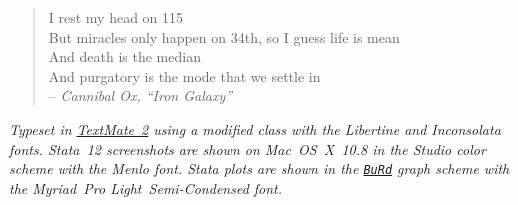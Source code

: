\newpage

\begin{fullwidth}

	\thispagestyle{empty}
	\setlength{\parindent}{0pt}
	\setlength{\parskip}{\baselineskip}

	\vspace*{\fill} 

	\begin{center}
	\begin{verse} 
	  I rest my head on 115\\
	  But miracles only happen on 34th, so I guess life is mean\\
	  And death is the median\\
	  And purgatory is the mode that we settle in\\[1em]
  
	  -- \emph{Cannibal Ox, ``Iron Galaxy''}
	\end{verse}
	\end{center}

	\vspace*{\fill}

	\footnotesize{\emph{%
		Typeset in \href{https://github.com/textmate/textmate}{TextMate~2} %
		using a modified \href{https://code.google.com/p/tufte-latex/}{\TL} %
		class with the Libertine and Inconsolata fonts. %
		Stata~12 screenshots are shown on Mac~OS~X~10.8 in the Studio color scheme with the Menlo font. %
		Stata plots are shown in the %
		\href{https://github.com/briatte/srqm/wiki/burd} {\texttt{BuRd}} %
		graph scheme with the Myriad~Pro Light~Semi-Condensed font.%
	}}

\end{fullwidth}
